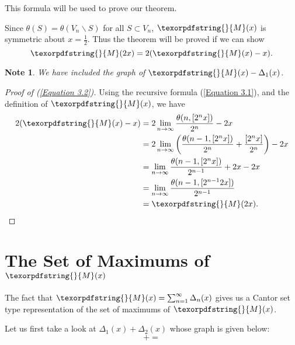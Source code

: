 \documentclass[12pt]{ucthesis}
\theoremstyle{plain}
\newtheorem*{note}{Note}
\theoremstyle{definition}
\newcommand{\takagi}{
  \texorpdfstring{\protect}{M}
}
\begin{document}
This formula will be used to prove our theorem.

Since $\theta(S) = \theta(V_n \backslash S)$ for all $S \subset V_n$,
$\takagi(x)$ is symmetric about $x = \frac{1}{2}$.
Thus the theorem will be proved if we can show
\begin{equation}
\label{Equation 3.2}
\takagi(2 x) = 2 (\takagi(x) - x).
\end{equation}

\begin{note}
We have included the graph of $\takagi(x) - \Delta_1(x)$.
\end{note}
\begin{figure}[h!]
	\centering
	
\end{figure}

\begin{proof}[Proof of (\ref{Equation 3.2})]
Using the recursive formula (\ref{Equation 3.1}),
and the definition of $\takagi(x)$, we have
\begin{align*}
2 (\takagi(x) - x)
& = 2 \lim_{n \rightarrow \infty} \frac{\theta(n, [2^n x])}{2^n} - 2 x \\
& = 2 \lim_{n \rightarrow \infty} \left(\frac{\theta(n - 1, [2^n x])}{2^n} +
\frac{[2^n x]}{2^n}\right) - 2 x \\
& = \lim_{n \rightarrow \infty} \frac{\theta(n - 1, [2^n x])}{2^{n - 1}} + 2 x - 2 x \\
& = \lim_{n \rightarrow \infty} \frac{\theta(n - 1, [2^{n - 1} 2 x])}{2^{n - 1}} \\
& = \takagi(2 x).
\end{align*}
\end{proof}

\section{The Set of Maximums of $\takagi(x)$}
\label{Section 3.3}

The fact that $\takagi(x) = \sum_{n = 1}^\infty \Delta_n(x)$ gives us
a Cantor set type representation of the set of maximums of $\takagi(x)$.

Let us first take a look at $\Delta_1(x) + \Delta_2(x)$ whose graph is given below:
\begin{equation*}
 +
 =

\end{equation*}
\end{document}
